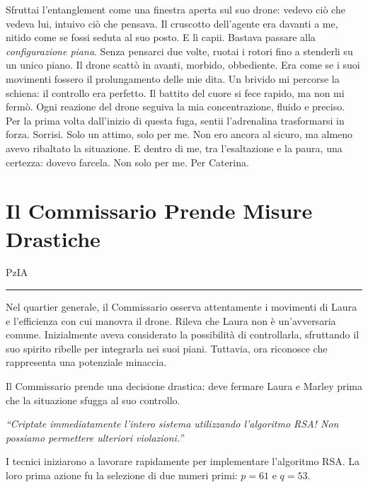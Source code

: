 Sfruttai l'entanglement come una finestra aperta sul suo drone: vedevo ciò che vedeva lui, intuivo ciò che pensava. Il cruscotto dell'agente era davanti a me, nitido come se fossi seduta al suo posto. E lì capii. Bastava passare alla \textit{configurazione piana}.
Senza pensarci due volte, ruotai i rotori fino a stenderli su un unico piano. Il drone scattò in avanti, morbido, obbediente. Era come se i suoi movimenti fossero il prolungamento delle mie dita. Un brivido mi percorse la schiena: il controllo era perfetto.
Il battito del cuore si fece rapido, ma non mi fermò. Ogni reazione del drone seguiva la mia concentrazione, fluido e preciso. Per la prima volta dall'inizio di questa fuga, sentii l'adrenalina trasformarsi in forza.
Sorrisi. Solo un attimo, solo per me. Non ero ancora al sicuro, ma almeno avevo ribaltato la situazione. E dentro di me, tra l'esaltazione e la paura, una certezza: dovevo farcela. Non solo per me. Per Caterina.



\section{Il Commissario Prende Misure Drastiche}

\vspace{1em}
\begin{center}PzIA\end{center}
\hrule
\vspace{1em}


Nel quartier generale, il Commissario osserva attentamente i movimenti di Laura e l'efficienza con cui manovra il drone. Rileva che Laura non è un'avversaria comune. Inizialmente aveva considerato la possibilità di controllarla, sfruttando il suo spirito ribelle per integrarla nei suoi piani. Tuttavia, ora riconosce che rappresenta una potenziale minaccia.

Il Commissario prende una decisione drastica: deve fermare Laura e Marley prima che la situazione sfugga al suo controllo.

\begin{tcolorbox}[colback=white!95!blue!5, colframe=blue!75!black, title=\textbf{Ordine del Commissario}, fonttitle=\bfseries]
\emph{\enquote{Criptate immediatamente l’intero sistema utilizzando l'algoritmo RSA! Non possiamo permettere ulteriori violazioni.}}
\end{tcolorbox}

I tecnici iniziarono a lavorare rapidamente per implementare l’algoritmo RSA. 
La loro prima azione fu la selezione di due numeri primi: \( p = 61 \) e \( q = 53 \).

